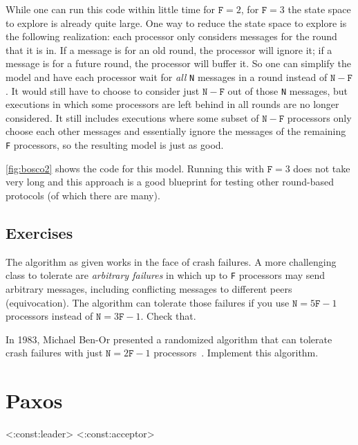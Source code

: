 \documentclass{report}
\begin{document}
{While one can run this code within little time for $\mathtt{F} = 2$, for
$\mathtt{F} = 3$ the state space to explore is already quite large.
One way to reduce the state space to explore is the following realization:
each processor only considers messages for the round that it is in.
If a message is for an old round, the processor will ignore it;
if a message is for a future round, the processor will buffer it.
So one can simplify the model and have each processor wait
for \emph{all} \texttt{N} messages in a round
instead of $\mathtt{N} - \mathtt{F}$.
It would still have to choose to consider just $\mathtt{N} - \mathtt{F}$
out of those \texttt{N} messages, but executions in which some processors
are left behind in all rounds are no longer considered.
It still includes executions where some subset of $\mathtt{N} - \mathtt{F}$
processors only choose each other messages and essentially ignore the
messages of the remaining \texttt{F} processors, so the resulting model
is just as good.

\autoref{fig:bosco2} shows the code for this model.  Running this with
$\mathtt{F} = 3$ does not take very long and this approach is a good
blueprint for testing other round-based protocols (of which there are
many).

\section*{Exercises}
\begin{problems}
\item The algorithm as given works in the face of crash failures.
A more challenging class to tolerate are \emph{arbitrary failures} in
which up to \texttt{F} processors may send arbitrary messages, including
conflicting messages to different peers (equivocation).
The algorithm can tolerate those failures if you use $\mathtt{N} = 5\mathtt{F} - 1$ processors instead of $\mathtt{N} = 3\mathtt{F} - 1$.  Check that.
\item In 1983, Michael Ben-Or presented a randomized algorithm that can
tolerate crash failures with
just $\mathtt{N} = 2\mathtt{F} - 1$ processors~\cite{BenOr83}.
Implement this algorithm.
\end{problems}

\chapter{Paxos}
\label{ch:paxos}

<{:const:leader}>
<{:const:acceptor}>

}
\end{document}
